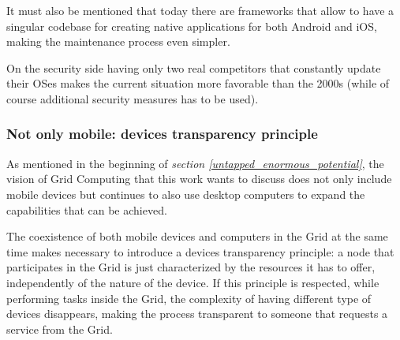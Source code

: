It must also be mentioned that today there are frameworks that allow to have a singular codebase for creating native applications for both Android and iOS, making the maintenance process even simpler.

On the security side having only two real competitors that constantly update their OSes makes the current situation more favorable than the 2000s (while of course additional security measures has to be used).

\subsubsection{Not only mobile: devices transparency principle}
As mentioned in the beginning of \textit{section \ref{untapped_enormous_potential}}, the vision of Grid Computing that this work wants to discuss does not only include mobile devices but continues to also use desktop computers to expand the capabilities that can be achieved.

The coexistence of both mobile devices and computers in the Grid at the same time makes necessary to introduce a devices transparency principle: a node that participates in the Grid is just characterized by the resources it has to offer, independently of the nature of the device. If this principle is respected, while performing tasks inside the Grid, the complexity of having different type of devices disappears, making the process transparent to someone that requests a service from the Grid.

